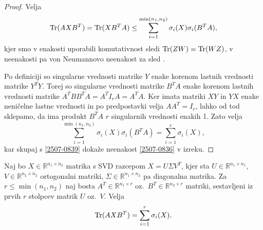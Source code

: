 \begin{proof}
    Velja
    \begin{align}
        \label{2507-0839}
        \operatorname{Tr}(AXB^T) = \operatorname{Tr}(XB^TA) \leq \sum^{\min(n_1, n_2)}_{i=1} \sigma_i(X) \sigma_i(B^TA),
    \end{align}
    kjer smo v enakosti uporabili komutativnost sledi $\operatorname{Tr}(ZW)=\operatorname{Tr}(WZ)$,
    v neenakosti pa von Neumannovo neenakost za sled \cite{TNNM-HZYLH12}.

    Po definiciji so singularne vrednosti matrike $Y$ enake korenom lastnih vrednosti matrike $Y^TY$. Torej so singularne vrednosti matrike $B^TA$ enake korenom lastnih vrednosti matrike $A^TBB^TA=A^TI_rA = A^TA$.
    Ker imata matriki $XY$ in $YX$ enake neničelne lastne vrednosti in po predpostavki velja $AA^T = I_r$, lahko
    od tod sklepamo, da ima produkt $B^TA$ $r$ singularnih vrednosti enakih 1.
    Zato velja
    \[
        \sum^{\min(n_1, n_2)}_{i=1} \sigma_i(X) \sigma_i(B^TA) = \sum^{r}_{i=1} \sigma_i(X),
    \]
    kar skupaj s \eqref{2507-0839}
    dokaže neenakost \eqref{2507-0836}
    v izreku.
\end{proof}

\begin{theorem}
    \label{2507-0851}
    Naj bo $X \in \mathbb{R}^{n_1 \times n_2}$ matrika s SVD razcepom 
    $X = U \Sigma V^T$,
    kjer sta $U\in \mathbb R^{n_1\times n_1}$, 
    $V\in \mathbb R^{n_2\times n_2}$ ortogonalni matriki,
    $\Sigma\in \mathbb R^{n_1\times n_2}$ pa diagonalna matrika.
    Za $r\leq \min(n_1,n_2)$
    naj bosta $A^T\in \mathbb R^{n_1\times r}$ oz.\ 
    $B^T\in \mathbb R^{n_2\times r}$ matriki, sestavljeni
    iz prvih $r$ stolpcev matrik $U$ oz.\ $V$.
    Velja
    \[\operatorname{Tr}(AXB^T) = \sum^{r}_{i=1} \sigma_i(X).\]
\end{theorem}

